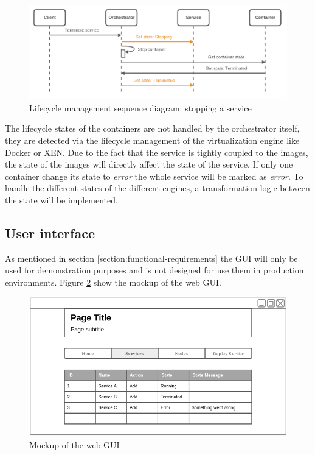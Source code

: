\begin{figure}[H]
    \centering
    \includegraphics[width=\textwidth]{resources/images/lifecycle_sequence_diagram_stop_service.png}
    \caption[Lifecycle management sequence diagram: stopping a service]{Lifecycle management sequence diagram: stopping a service}
    \label{fig:lifecycle_mgm_squence_diagram_stop_service}
\end{figure}

The lifecycle states of the containers are not handled by the orchestrator itself, they are detected via the lifecycle management of the virtualization engine like Docker or XEN.
Due to the fact that the service is tightly coupled to the images, the state of the images will directly affect the state of the service.
If only one container change its state to \textit{error} the whole service will be marked as \textit{error}.
To handle the different states of the different engines, a transformation logic between the state will be implemented.


\subsection{User interface}
As mentioned in section \ref{section:functional-requirements} the \ac{GUI} will only be used for demonstration purposes and is not designed for use them in production environments.
Figure \ref{fig:gui_mockup} show the mockup of the web \ac{GUI}.

\begin{figure}[H]
    \centering
    \includegraphics[width=\textwidth]{resources/images/gui_prototype.png}
    \caption[Mockup of the web GUI]{Mockup of the web GUI}
    \label{fig:gui_mockup}
\end{figure}


